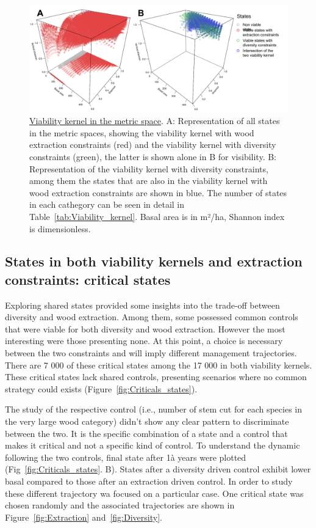 \documentclass{article}
\begin{document}
\begin{figure}[hb!]
    \centering
    \includegraphics[width=\textwidth]{Figure/Results/Viability_kernel.png}
    \caption{\underline{Viability kernel in the metric space}. A: Representation of all states in the metric spaces, showing the viability kernel with wood extraction constraints (red) and the viability kernel with diversity constraints (green), the latter is shown alone in B for visibility. B: Representation of the viability kernel with diversity constraints, among them the states that are also in the viability kernel with wood extraction constraints are shown in blue. The number of states in each cathegory can be seen in detail in Table~\ref{tab:Viability_kernel}. Basal area is in m²/ha, Shannon index is dimensionless.}
    \label{fig:Viability_kernel}
\end{figure}

\subsection{States in both viability kernels and extraction constraints: critical states}

Exploring shared states provided some insights into the trade-off between diversity and wood extraction. Among them, some possessed common controls that were viable for both diversity and wood extraction. However the most interesting were those presenting none. At this point, a choice is necessary between the two constraints and will imply different management trajectories. There are 7 000 of these critical states among the 17 000 in both viability kernels. These critical states lack shared controls, presenting scenarios where no common strategy could exists (Figure~\ref{fig:Criticals_states}).

The study of the respective control (i.e., number of stem cut for each species in the very large wood category) didn't show any clear pattern to discriminate between the two. It is the specific combination of a state and a control that makes it critical and not a specific kind of control. To understand the dynamic following the two controls, final state after 1à years were plotted (Fig~\ref{fig:Criticals_states}. B). States after a diversity driven control exhibit lower basal compared to those after an extraction driven control. In order to study these different trajectory wa focused on a particular case. One critical state was chosen randomly and the associated trajectories are shown in Figure~\ref{fig:Extraction} and~\ref{fig:Diversity}.
\end{document}
